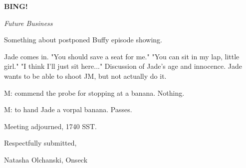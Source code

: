 \documentclass[12pt]{article}
\newcommand{\bing}{{\bf BING!} }
\newcommand{\goto}[1]{\bing \vskip 12pt \centerline{{\em{#1}}}}
\begin{document}
\goto{Future Business}

Something about postponed Buffy episode showing.

Jade comes in. "You should save a seat for me." "You can sit in my lap, little girl." "I think I'll just sit here..." Discussion of Jade's age and innocence. Jade wants to be able to shoot JM, but not actually do it.

M: commend the probe for stopping at a banana. Nothing.

M: to hand Jade a vorpal banana. Passes.

\vspace{12pt}

\noindent
Meeting adjourned, 1740 SST.

\vspace{18pt}

\centerline{Respectfully submitted,}
\centerline{Natasha Olchanski, Onseck}
\end{document}
